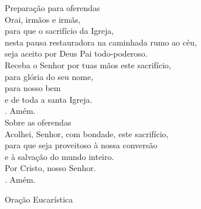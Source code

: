 \documentclass{book}
\begin{document}
\begin{flushleft}
    \textcolor{VioletRed2}{Preparação para oferendas}
    \vspace{.2cm} \\
    Orai, irmãos e irmãs, \\
    para que o sacrifício da Igreja, \\
    nesta pausa restauradora na caminhada rumo ao céu, \\
    seja aceito por Deus Pai todo-poderoso.
    \vspace{.2cm} \\
    Receba o Senhor por tuas mãos este sacrifício, \\
    para glória do seu nome, \\
    para nosso bem \\
    e de toda a santa Igreja.
    \vspace{.2cm} \\
    {\color{VioletRed2} \Rbar.} Amém.
    \vspace{.2cm} \\
    \textcolor{VioletRed2}{Sobre as oferendas}
    \vspace{.2cm} \\
    Acolhei, Senhor, com bondade, este sacrifício, \\
    para que seja proveitoso à nossa conversão \\
    e à salvação do mundo inteiro. \\
    Por Cristo, nosso Senhor. \\
    {\color{VioletRed2} \Rbar.} Amém.
\end{flushleft}
\begin{center}
    \textcolor{VioletRed2}{Oração Eucarística}
\end{center}
\end{document}
